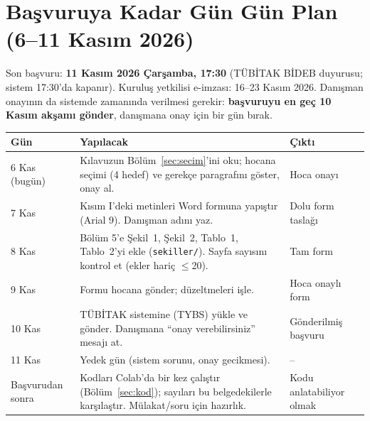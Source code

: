 \section{Başvuruya Kadar Gün Gün Plan (6–11 Kasım 2026)}
\label{sec:basvuru}

\begin{dikkat}[Tarihler]
Son başvuru: \textbf{11 Kasım 2026 Çarşamba, 17:30} (TÜBİTAK BİDEB duyurusu; sistem 17:30'da kapanır).
Kuruluş yetkilisi e-imzası: 16–23 Kasım 2026. Danışman onayının da sistemde zamanında verilmesi gerekir:
\textbf{başvuruyu en geç 10 Kasım akşamı gönder}, danışmana onay için bir gün bırak.
\end{dikkat}

\begin{center}
\small
\begin{tabularx}{\textwidth}{l >{\raggedright\arraybackslash}X >{\raggedright\arraybackslash}X}
\toprule
Gün & Yapılacak & Çıktı\\
\midrule
6 Kas (bugün) & Kılavuzun Bölüm~\ref{sec:secim}'ini oku; hocana seçimi (4 hedef) ve gerekçe paragrafını göster, onay al. & Hoca onayı\\
7 Kas & Kısım I'deki metinleri Word formuna yapıştır (Arial 9). Danışman adını yaz. & Dolu form taslağı\\
8 Kas & Bölüm 5'e Şekil~1, Şekil~2, Tablo~1, Tablo~2'yi ekle (\texttt{sekiller/}). Sayfa sayısını kontrol et (ekler hariç $\le$20). & Tam form\\
9 Kas & Formu hocana gönder; düzeltmeleri işle. & Hoca onaylı form\\
10 Kas & TÜBİTAK sistemine (TYBS) yükle ve gönder. Danışmana “onay verebilirsiniz” mesajı at. & Gönderilmiş başvuru\\
11 Kas & Yedek gün (sistem sorunu, onay gecikmesi). & --\\
Başvurudan sonra & Kodları Colab'da bir kez çalıştır (Bölüm~\ref{sec:kod}); sayıları bu belgedekilerle karşılaştır. Mülakat/soru için hazırlık. & Kodu anlatabiliyor olmak\\
\bottomrule
\end{tabularx}
\end{center}


